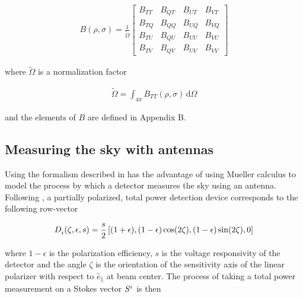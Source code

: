 \documentclass[a4paper,11pt]{article}
\newcommand{\co}{\mathbin{\|}}
\begin{document}
\begin{equation}
\begin{aligned}
B(\rho,\sigma) = \frac{1}{\tilde{\Omega}}
\begin{bmatrix}
B_{TT} & B_{QT} & B_{UT} & B_{VT}\\
B_{TQ} & B_{QQ} & B_{UQ} & B_{VQ}\\
B_{TU} & B_{QU} & B_{UU} & B_{VU}\\
B_{TV} & B_{QV} & B_{UV} & B_{VV}
\end{bmatrix}
\end{aligned}
\label{eq::beamsor}
\end{equation}

\noindent
where $\tilde{\Omega}$ is a normalization factor

\begin{equation}
\begin{aligned}
\tilde{\Omega} = \int_{4\pi} B_{TT}(\rho,\sigma) \, \mathrm{d} \Omega
\end{aligned}
\end{equation}

\noindent
and the elements of $B$ are defined in Appendix B. 

\subsection{Measuring the sky with antennas}

Using the formalism described in \cite{2007MNRAS.376.1767O} has the advantage of using Mueller calculus to model the process by which a detector measures the sky using an antenna. Following \cite{2007A&A...470..771J}, a partially polarized, total power detection device corresponds to the following row-vector 

\begin{equation}
\begin{aligned}
\tensor{D}{_{i}}(\zeta,\epsilon,s) = \frac{s}{2} \left[(1 + \epsilon), (1 - \epsilon)\cos(2\zeta), (1 - \epsilon)\sin(2\zeta), 0 \right]
\end{aligned}
\label{eq::M_pol}
\end{equation}

\noindent
where $1 - \epsilon$ is the polarization efficiency, $s$ is the voltage responsivity of the detector and the angle $\zeta$ is the orientation of the sensitivity axis of the linear polarizer with respect to $\hat{e}_{\co}$ at beam center. The process of taking a total power measurement on a Stokes vector $\tensor{S}{^{i}}$ is then
\end{document}
